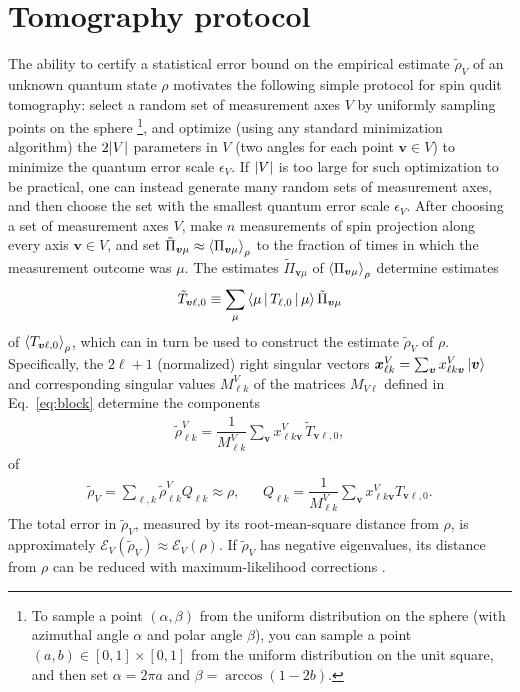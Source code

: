 \documentclass[notitlepage,twocolumn]{revtex4-2}
\newcommand{\f}[2]{\dfrac{#1}{#2}} %
\newcommand{\p}[1]{\left(#1\right)} %
\newcommand{\bk}{\Braket} %
\renewcommand{\v}{\bm} %
\newcommand{\E}{\mathcal{E}}
\begin{document}
\section{Tomography protocol}
\label{sec:protocol}

The ability to certify a statistical error bound on the empirical estimate $\tilde\rho_V$ of an unknown quantum state $\rho$ motivates the following simple protocol for spin qudit tomography: select a random set of measurement axes $V$ by uniformly sampling points on the sphere \footnote{To sample a point $\p{\alpha,\beta}$ from the uniform distribution on the sphere (with azimuthal angle $\alpha$ and polar angle $\beta$), you can sample a point $\p{a,b}\in[0,1]\times[0,1]$ from the uniform distribution on the unit square, and then set $\alpha=2\pi a$ and $\beta=\arccos\p{1-2b}$.}, and optimize (using any standard minimization algorithm) the $2\abs{V}$ parameters in $V$ (two angles for each point $\v v\in V$) to minimize the quantum error scale $\epsilon_V$.
If $\abs{V}$ is too large for such optimization to be practical, one can instead generate many random sets of measurement axes, and then choose the set with the smallest quantum error scale $\epsilon_V$.
After choosing a set of measurement axes $V$, make $n$ measurements of spin projection along every axis $\v v\in V$, and set $\tilde\Pi_{\v v\mu}\approx\bk{\Pi_{\v v\mu}}_\rho$ to the fraction of times in which the measurement outcome was $\mu$.
The estimates $\tilde\Pi_{\v v\mu}$ of $\bk{\Pi_{\v v\mu}}_\rho$ determine estimates
\begin{align}
  \tilde T_{\v v\ell,0}
  \equiv \sum_\mu \bk{\mu|T_{\ell,0}|\mu} \tilde\Pi_{\v v\mu}
\end{align}
of $\bk{T_{\v v\ell,0}}_\rho$, which can in turn be used to construct the estimate $\tilde\rho_V$ of $\rho$.
Specifically, the $2\ell+1$ (normalized) right singular vectors $\v x^V_{\ell k} = \sum_{\v v} x^V_{\ell k \v v} \ket{\v v}$ and corresponding singular values $M^V_{\ell k}$ of the matrices $M_{V\ell}$ defined in Eq.~\eqref{eq:block} determine the components
\begin{align}
  \tilde\rho^V_{\ell k}
  = \f1{M^V_{\ell k}} \sum_{\v v}
  x^V_{\ell k\v v} \, \tilde T_{\v v\ell,0},
\end{align}
of
\begin{align}
  \tilde\rho_V = \sum_{\ell,k} \tilde\rho^V_{\ell k} Q_{\ell k}
  \approx \rho,
  &&
  Q_{\ell k} = \f1{M^V_{\ell k}} \sum_{\v v}
  x^V_{\ell k\v v} T_{\v v\ell,0}.
\end{align}
The total error in $\tilde\rho_V$, measured by its root-mean-square distance from $\rho$, is approximately $\E_V\p{\tilde\rho_V}\approx\E_V\p{\rho}$.
If $\tilde\rho_V$ has negative eigenvalues, its distance from $\rho$ can be reduced with maximum-likelihood corrections \cite{smolin2012efficient}.
\end{document}
